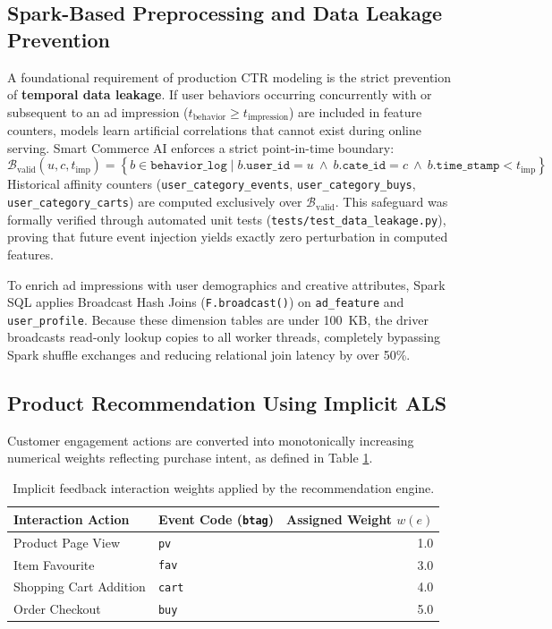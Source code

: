 \documentclass[10pt,a4paper,twoside]{article}
\begin{document}
\subsection{Spark-Based Preprocessing and Data Leakage Prevention}
A foundational requirement of production CTR modeling is the strict prevention of \textbf{temporal data leakage}. If user behaviors occurring concurrently with or subsequent to an ad impression ($t_{\text{behavior}} \ge t_{\text{impression}}$) are included in feature counters, models learn artificial correlations that cannot exist during online serving. Smart Commerce AI enforces a strict point-in-time boundary:
\begin{equation}
\mathcal{B}_{\text{valid}}(u, c, t_{\text{imp}}) = \left\{ b \in \texttt{behavior\_log} \mid b.\texttt{user\_id} = u \ \land \ b.\texttt{cate\_id} = c \ \land \ b.\texttt{time\_stamp} < t_{\text{imp}} \right\}
\end{equation}
Historical affinity counters (\texttt{user\_category\_events}, \texttt{user\_category\_buys}, \texttt{user\_category\_carts}) are computed exclusively over $\mathcal{B}_{\text{valid}}$. This safeguard was formally verified through automated unit tests (\texttt{tests/test\_data\_leakage.py}), proving that future event injection yields exactly zero perturbation in computed features.

To enrich ad impressions with user demographics and creative attributes, Spark SQL applies Broadcast Hash Joins (\texttt{F.broadcast()}) on \texttt{ad\_feature} and \texttt{user\_profile}. Because these dimension tables are under 100~KB, the driver broadcasts read-only lookup copies to all worker threads, completely bypassing Spark shuffle exchanges and reducing relational join latency by over 50\%.

\subsection{Product Recommendation Using Implicit ALS}
Customer engagement actions are converted into monotonically increasing numerical weights reflecting purchase intent, as defined in Table \ref{tab:interaction_weights}.

\begin{table}[ht]
\centering
\small
\caption{Implicit feedback interaction weights applied by the recommendation engine.}
\label{tab:interaction_weights}
\begin{tabular}{llr}
\toprule
\textbf{Interaction Action} & \textbf{Event Code (\texttt{btag})} & \textbf{Assigned Weight $w(e)$} \\
\midrule
Product Page View & \texttt{pv} & 1.0 \\
Item Favourite & \texttt{fav} & 3.0 \\
Shopping Cart Addition & \texttt{cart} & 4.0 \\
Order Checkout & \texttt{buy} & 5.0 \\
\bottomrule
\end{tabular}
\end{table}
\end{document}
